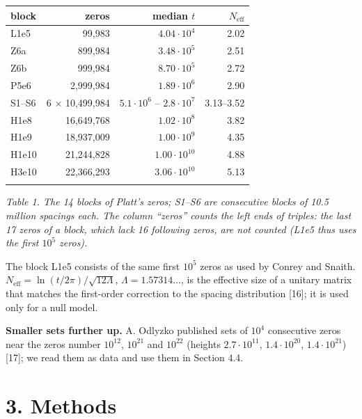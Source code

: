 \documentclass[
  10pt,
]{article}
\begin{document}
{\small\begin{longtable}[]{@{}lrrr@{}}
\toprule\noalign{}
block & zeros & median \(t\) & \(N_{\mathrm{eff}}\) \\
\midrule\noalign{}
\endhead
\bottomrule\noalign{}
\endlastfoot
L1e5 & 99,983 & \(4.04\cdot10^4\) & 2.02 \\ \addlinespace[2pt]
Z6a & 899,984 & \(3.48\cdot10^5\) & 2.51 \\ \addlinespace[2pt]
Z6b & 999,984 & \(8.70\cdot10^5\) & 2.72 \\ \addlinespace[2pt]
P5e6 & 2,999,984 & \(1.89\cdot10^6\) & 2.90 \\ \addlinespace[2pt]
S1--S6 & 6 × 10,499,984 & \(5.1\cdot10^6\) -- \(2.8\cdot10^7\) &
3.13--3.52 \\ \addlinespace[2pt]
H1e8 & 16,649,768 & \(1.02\cdot10^8\) & 3.82 \\ \addlinespace[2pt]
H1e9 & 18,937,009 & \(1.00\cdot10^9\) & 4.35 \\ \addlinespace[2pt]
H1e10 & 21,244,828 & \(1.00\cdot10^{10}\) & 4.88 \\ \addlinespace[2pt]
H3e10 & 22,366,293 & \(3.06\cdot10^{10}\) & 5.13 \\ \addlinespace[2pt]
\end{longtable}}

\emph{Table 1. The 14 blocks of Platt's zeros; S1--S6 are consecutive
blocks of 10.5 million spacings each. The column ``zeros'' counts the
left ends of triples: the last 17 zeros of a block, which lack 16
following zeros, are not counted (L1e5 thus uses the first \(10^5\)
zeros).}

The block L1e5 consists of the same first \(10^5\) zeros as used by
Conrey and Snaith. \(N_{\mathrm{eff}} = \ln(t/2\pi)/\sqrt{12\Lambda}\),
\(\Lambda = 1.57314\ldots\), is the effective size of a unitary matrix
that matches the first-order correction to the spacing distribution
{[}16{]}; it is used only for a null model.

\textbf{Smaller sets further up.} A. Odlyzko published sets of \(10^4\)
consecutive zeros near the zeros number \(10^{12}\), \(10^{21}\) and
\(10^{22}\) (heights \(2.7\cdot10^{11}\), \(1.4\cdot10^{20}\),
\(1.4\cdot10^{21}\)) {[}17{]}; we read them as data and use them in
Section 4.4.

\hypertarget{methods}{%
\section{3. Methods}\label{methods}}
\end{document}
